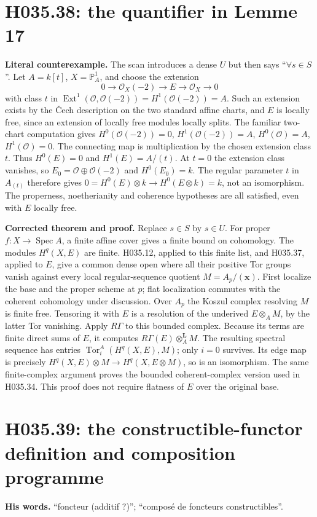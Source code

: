 \section{H035.38: the quantifier in Lemme 17}
\textbf{Literal counterexample.} The scan introduces a dense $U$
but then says ``$\forall s\in S$''. Let $A=k[t]$,
$X=\mathbb P^1_A$, and choose the extension
\[
 0\longrightarrow\mathcal O_X(-2)\longrightarrow E
 \longrightarrow\mathcal O_X\longrightarrow0
\]
with class $t$ in $\operatorname{Ext}^1(\mathcal O,\mathcal O(-2))
=H^1(\mathcal O(-2))=A$. Such an extension exists by the
Čech description on the two standard affine charts, and $E$ is
locally free, since an extension of locally free modules locally
splits. The familiar two-chart computation gives
$H^0(\mathcal O(-2))=0$, $H^1(\mathcal O(-2))=A$,
$H^0(\mathcal O)=A$, $H^1(\mathcal O)=0$. The connecting map
is multiplication by the chosen extension class $t$. Thus
$H^0(E)=0$ and $H^1(E)=A/(t)$. At $t=0$ the extension class
vanishes, so $E_0=\mathcal O\oplus\mathcal O(-2)$ and
$H^0(E_0)=k$. The regular parameter $t$ in $A_{(t)}$ therefore
gives $0=H^0(E)\otimes k\to H^0(E\otimes k)=k$, not an
isomorphism. The properness, noetherianity and coherence hypotheses
are all satisfied, even with $E$ locally free.

\textbf{Corrected theorem and proof.} Replace $s\in S$ by
$s\in U$. For proper $f:X\to\operatorname{Spec}A$, a finite
affine cover gives a finite bound on cohomology. The modules
$H^q(X,E)$ are finite. H035.12, applied to this finite list,
and H035.37, applied to $E$, give a common dense open where
all their positive Tor groups vanish against every local
regular-sequence quotient $M=A_p/(\mathbf x)$.
First localize the base and the proper scheme at $p$; flat localization
commutes with the coherent cohomology under discussion. Over $A_p$
the Koszul complex resolving $M$ is finite free. Tensoring it
with $E$ is a resolution of the underived $E\otimes_A M$,
by the latter Tor vanishing. Apply $R\Gamma$ to this bounded
complex. Because its terms are finite direct sums of $E$, it
computes $R\Gamma(E)\otimes_A^{\mathbf L}M$. The resulting
spectral sequence has entries
$\operatorname{Tor}_i^A(H^q(X,E),M)$; only $i=0$ survives.
Its edge map is precisely
$H^q(X,E)\otimes M\to H^q(X,E\otimes M)$, so is an
isomorphism. The same finite-complex argument proves the
bounded coherent-complex version used in H035.34. This proof
does not require flatness of $E$ over the original base.

\section{H035.39: the constructible-functor definition and composition programme}
\textbf{His words.} ``foncteur (additif ?)''; ``composé de foncteurs
constructibles''.

